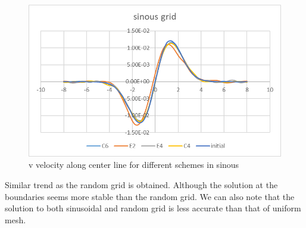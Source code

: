 \documentclass{hcmut-report}
\begin{document}
    \begin{figure}[H]
        \centering
        \includegraphics[width=0.6\linewidth]{graphics/sinous.png}
        \caption{v velocity along center line for different schemes in sinous}
        \label{fig:my_label}
    \end{figure}

    Similar trend as the random grid is obtained. Although the solution at the boundaries seems more stable than the random grid. We can also note that the solution to both sinusoidal and random grid is less accurate than that of uniform mesh.  
    
\end{document}
